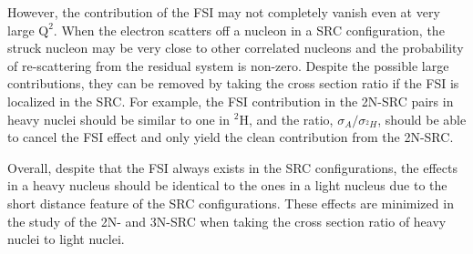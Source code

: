   However, the contribution of the FSI may not completely vanish even at very large $\mathrm{Q^{2}}$. When the electron scatters off a nucleon in a SRC configuration, the struck nucleon may be very close to other correlated nucleons and the probability of re-scattering from the residual system is non-zero. Despite the possible large contributions, they can be removed by taking the cross section ratio if the FSI is localized in the SRC. For example, the FSI contribution in the 2N-SRC pairs in heavy nuclei should be similar to one in $\mathrm{^{2}H}$, and the ratio, $\sigma_{A}/\sigma_{^{2}H}$, should be able to cancel the FSI effect and only yield the clean contribution from the 2N-SRC. 

 Overall, despite that the FSI always exists in the SRC configurations, the effects in a heavy nucleus should be identical to the ones in a light nucleus due to the short distance feature of the SRC configurations. These effects are minimized in the study of the 2N- and 3N-SRC when taking the cross section ratio of heavy nuclei to light nuclei.

